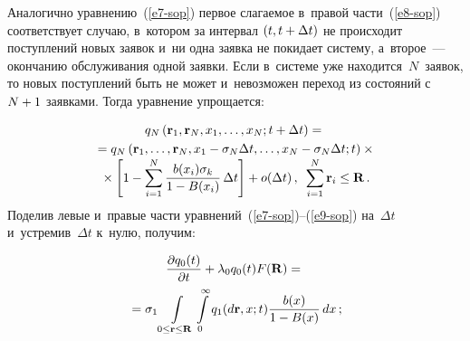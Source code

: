\begin{multicols}{2}
  Аналогично уравнению~(\ref{e7-sop}) первое слагаемое в~правой 
части~(\ref{e8-sop}) соответствует случаю, в~котором за интервал $(t, 
t\hm+\Delta t)$ не происходит поступлений новых заявок и~ни одна заявка не 
покидает систему, а~второе~--- окончанию обслуживания одной заявки. Если 
в~системе уже находится~$N$~заявок, то новых поступлений быть не может 
и~невозможен переход из состояний с~$N\hm+1$ заявками. Тогда уравнение 
упрощается:

\vspace*{-3pt}

\noindent
  \begin{multline}
  q_N\left( \mathbf{r}_1, \mathbf{r}_N, x_1,\ldots, x_N; t+\Delta t\right)={}\\
  {}=q_N\left( \mathbf{r}_1,\ldots, \mathbf{r}_N, x_1-\sigma_N \Delta t, \ldots, 
x_N-\sigma_N \Delta t;t\right)\times{}\\[-3pt]
\!\!{}\times\left[ 1-\sum\limits^N_{i=1} \displaystyle\frac{\displaystyle b(x_i)\sigma_k\mathstrut}{\displaystyle 1-
B(x_i)\mathstrut}\,\Delta t\right] +o(\Delta t)\,,\enskip \sum\limits^N_{i=1} \mathbf{r}_i\leq 
\mathbf{R}\,.\!\!
  \label{e9-sop}
  \end{multline}
    Поделив левые и~правые части уравнений~(\ref{e7-sop})--(\ref{e9-sop}) 
на~$\Delta t$ и~устремив~$\Delta t$ к~нулю, получим:

\columnbreak

\noindent
  \begin{multline}
  \displaystyle\frac{\displaystyle \partial q_0(t)\mathstrut}{\displaystyle \partial t\mathstrut} +\lambda_0 q_0(t) F(\mathbf{R}) ={}\\[-1pt]
  {}=\sigma_1 
\int\limits_{0\leq \mathbf{r}\leq \mathbf{R}} \int\limits_0^\infty 
q_1(d\mathbf{r}, x; t) \displaystyle\frac{\displaystyle b(x)\mathstrut}{\displaystyle 1-B(x)\mathstrut}\,dx\,;\label{e10-sop}
  \end{multline}

\vspace*{-12pt}


\end{multicols}
